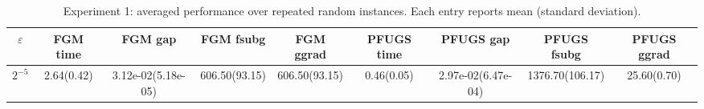 \begin{table}[htbp]
\centering
\caption{Experiment 1: averaged performance over repeated random instances. Each entry reports mean (standard deviation).}
\label{tab:exp1_matrix_game_repeats}
\small
\setlength{\tabcolsep}{4pt}
\renewcommand{\arraystretch}{1.1}
\begin{tabular}{c c c c c c c c c}
\hline
$\varepsilon$ & FGM time & FGM gap & FGM fsubg & FGM ggrad & PFUGS time & PFUGS gap & PFUGS fsubg & PFUGS ggrad \\
\hline
$2^{-5}$ & 2.64(0.42) & 3.12e-02(5.18e-05) & 606.50(93.15) & 606.50(93.15) & 0.46(0.05) & 2.97e-02(6.47e-04) & 1376.70(106.17) & 25.60(0.70) \\
\hline
\end{tabular}
\end{table}

